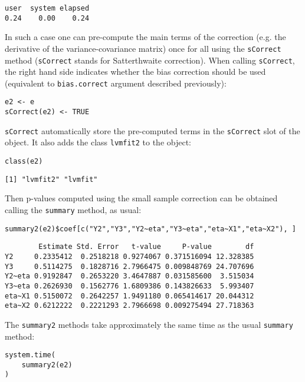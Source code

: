 \documentclass[12pt]{article}
\begin{document}
\begin{verbatim}
user  system elapsed 
0.24    0.00    0.24
\end{verbatim}

In such a case one can pre-compute the main terms of the correction
(e.g. the derivative of the variance-covariance matrix) once for all
using the \texttt{sCorrect} method (\texttt{sCorrect} stands for Satterthwaite
correction). When calling \texttt{sCorrect}, the right hand side indicates
whether the bias correction should be used (equivalent to
\texttt{bias.correct} argument described previously):
\lstset{language=r,label= ,caption= ,captionpos=b,numbers=none}
\begin{lstlisting}
e2 <- e
sCorrect(e2) <- TRUE
\end{lstlisting}

\texttt{sCorrect} automatically store the pre-computed terms in the \texttt{sCorrect}
slot of the object. It also adds the class \texttt{lvmfit2} to the object:
\lstset{language=r,label= ,caption= ,captionpos=b,numbers=none}
\begin{lstlisting}
class(e2)
\end{lstlisting}
\begin{verbatim}
[1] "lvmfit2" "lvmfit"
\end{verbatim}

Then p-values computed using the small sample correction can be
obtained calling the \texttt{summary} method, as usual:
\lstset{language=r,label= ,caption= ,captionpos=b,numbers=none}
\begin{lstlisting}
summary2(e2)$coef[c("Y2","Y3","Y2~eta","Y3~eta","eta~X1","eta~X2"), ]
\end{lstlisting}

\begin{verbatim}
        Estimate Std. Error   t-value     P-value        df
Y2     0.2335412  0.2518218 0.9274067 0.371516094 12.328385
Y3     0.5114275  0.1828716 2.7966475 0.009848769 24.707696
Y2~eta 0.9192847  0.2653220 3.4647887 0.031585600  3.515034
Y3~eta 0.2626930  0.1562776 1.6809386 0.143826633  5.993407
eta~X1 0.5150072  0.2642257 1.9491180 0.065414617 20.044312
eta~X2 0.6212222  0.2221293 2.7966698 0.009275494 27.718363
\end{verbatim}

The \texttt{summary2} methods take approximately the same time as the usual
\texttt{summary} method:
\lstset{language=r,label= ,caption= ,captionpos=b,numbers=none}
\begin{lstlisting}
system.time(
	summary2(e2)
)
\end{lstlisting}
\end{document}

